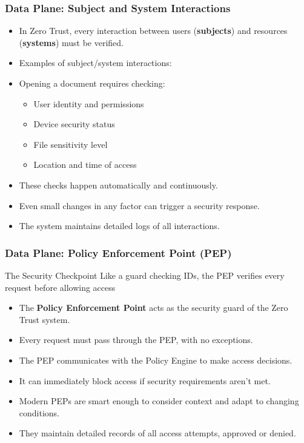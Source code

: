 \documentclass{beamer}
\begin{document}
\begin{frame}
    \frametitle{Data Plane: Subject and System Interactions}
    \begin{itemize}
        \item In Zero Trust, every interaction between users (\textbf{subjects}) and resources (\textbf{systems}) must be verified.
        \item Examples of subject/system interactions:
        \item Opening a document requires checking:
            \begin{itemize}
                \item User identity and permissions
                \item Device security status
                \item File sensitivity level
                \item Location and time of access
            \end{itemize}
        \item These checks happen automatically and continuously.
        \item Even small changes in any factor can trigger a security response.
        \item The system maintains detailed logs of all interactions.
    \end{itemize}
\end{frame}

\begin{frame}
    \frametitle{Data Plane: Policy Enforcement Point (PEP)}
    \begin{block}{The Security Checkpoint}
        Like a guard checking IDs, the PEP verifies every request before allowing access
    \end{block}
    \begin{itemize}
        \item The \textbf{Policy Enforcement Point} acts as the security guard of the Zero Trust system.
        \item Every request must pass through the PEP, with no exceptions.
        \item The PEP communicates with the Policy Engine to make access decisions.
        \item It can immediately block access if security requirements aren't met.
        \item Modern PEPs are smart enough to consider context and adapt to changing conditions.
        \item They maintain detailed records of all access attempts, approved or denied.
    \end{itemize}
\end{frame}
\end{document}
